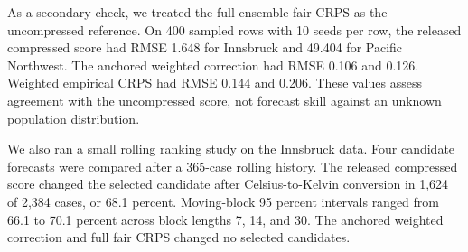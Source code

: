 \documentclass[11pt]{article}
\begin{document}
\begin{table}[htbp]
\centering
\caption{Absolute score change when the same forecasts are expressed in two temperature units. Innsbruck uses Celsius to Kelvin conversion. Pacific Northwest uses Kelvin to Celsius conversion. The practical pass rule requires a maximum no larger than $2\times10^{-4}$ degrees.}
\label{tab:realdata}
\small
{}
\end{table}

As a secondary check, we treated the full ensemble fair CRPS as the uncompressed reference. On 400 sampled rows with 10 seeds per row, the released compressed score had RMSE 1.648 for Innsbruck and 49.404 for Pacific Northwest. The anchored weighted correction had RMSE 0.106 and 0.126. Weighted empirical CRPS had RMSE 0.144 and 0.206. These values assess agreement with the uncompressed score, not forecast skill against an unknown population distribution.

We also ran a small rolling ranking study on the Innsbruck data. Four candidate forecasts were compared after a 365-case rolling history. The released compressed score changed the selected candidate after Celsius-to-Kelvin conversion in 1,624 of 2,384 cases, or 68.1 percent. Moving-block 95 percent intervals ranged from 66.1 to 70.1 percent across block lengths 7, 14, and 30. The anchored weighted correction and full fair CRPS changed no selected candidates.
\end{document}

